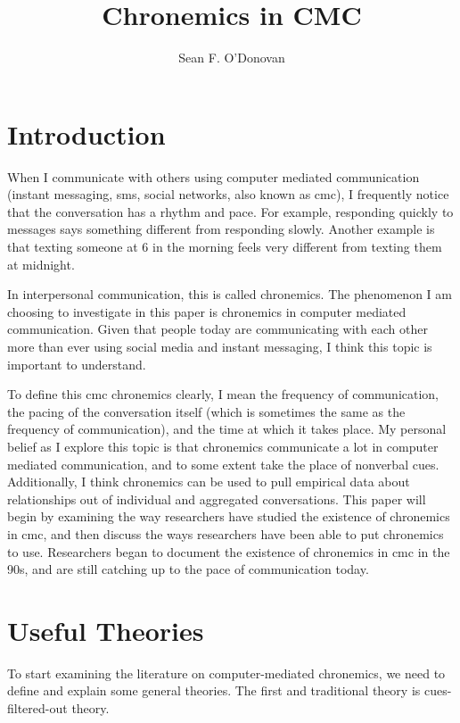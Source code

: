 \documentclass[
  stu]{apa7}
\affiliation{Brian Lamb School of Communication}
\title{Chronemics in CMC}
\author{Sean F. O'Donovan}
\date{}
\begin{document}
\maketitle

\hypertarget{introduction}{%
\section{Introduction}\label{introduction}}

When I communicate with others using computer mediated communication
(instant messaging, sms, social networks, also known as cmc), I
frequently notice that the conversation has a rhythm and pace. For
example, responding quickly to messages says something different from
responding slowly. Another example is that texting someone at 6 in the
morning feels very different from texting them at midnight.

In interpersonal communication, this is called chronemics. The
phenomenon I am choosing to investigate in this paper is chronemics in
computer mediated communication. Given that people today are
communicating with each other more than ever using social media and
instant messaging, I think this topic is important to understand.

To define this cmc chronemics clearly, I mean the frequency of
communication, the pacing of the conversation itself (which is sometimes
the same as the frequency of communication), and the time at which it
takes place. My personal belief as I explore this topic is that
chronemics communicate a lot in computer mediated communication, and to
some extent take the place of nonverbal cues. Additionally, I think
chronemics can be used to pull empirical data about relationships out of
individual and aggregated conversations. This paper will begin by
examining the way researchers have studied the existence of chronemics
in cmc, and then discuss the ways researchers have been able to put
chronemics to use. Researchers began to document the existence of
chronemics in cmc in the 90s, and are still catching up to the pace of
communication today.

\hypertarget{useful-theories}{%
\section{Useful Theories}\label{useful-theories}}

To start examining the literature on computer-mediated chronemics, we
need to define and explain some general theories. The first and
traditional theory is cues-filtered-out theory.
\end{document}
